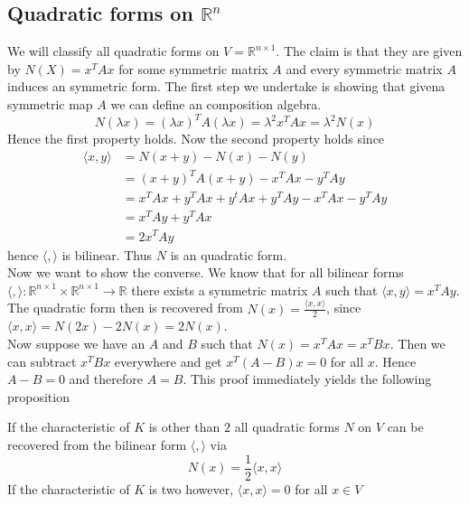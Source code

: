 \documentclass[../Thesis.tex]{subfiles}
\begin{document}
\subsection{Quadratic forms on $\mathbb{R}^n$}
We will classify all quadratic forms on $V = \mathbb{R}^{n \times 1}$. The claim is that they are given by $N(X) = x^T A x$ for some symmetric matrix $A$ and every symmetric matrix $A$ induces an symmetric form. The first step we undertake is showing that givena symmetric map $A$ we can define an composition algebra.
\begin{equation}
N(\lambda x) = (\lambda x) ^T A (\lambda x) = \lambda^2 x^T A x = \lambda^2 N(x)
\end{equation}
Hence the first property holds. Now the second property holds since
\begin{align}
\langle x, y \rangle &=  N( x + y) - N(x) - N(y) \\
                     &= (x + y)^T A(x + y) - x^TAx - y^TAy\\
                     &= x^TAx + y^TAx + y^tAx + y^TAy -x^TAx - y^TAy\\
                     &=x^TAy + y^TAx \\
                     &=2x^TAy
\end{align}
hence $\langle , \rangle$ is bilinear. Thus $N$ is an quadratic form.
\\Now we want to show the converse. We know that for all bilinear forms $ \langle , \rangle :\mathbb{R}^{n \times 1} \times \mathbb{R}^{n \times 1} \rightarrow \mathbb{R}$ there exists a symmetric matrix $A$ such that $\langle x, y\rangle = x^TAy$. The quadratic form then is recovered from $N(x) = \frac{\langle x, x\rangle}{2}$, since $\langle x, x\rangle = N(2x) - 2N(x) = 2N(x)$.
\\Now suppose we have an $A$ and $B$ such that $N(x) = x^TAx = x^TBx$. Then we can subtract $x^TBx$ everywhere and get $x^T(A-B)x = 0$ for all $x$. Hence $A-B = 0$ and therefore $A = B$.
This proof immediately yields the following proposition
\begin{prop}
If the characteristic of $K$ is other than $2$ all quadratic forms $N$ on $V$ can be recovered from the bilinear form $\langle , \rangle$ via 
\begin{equation}
N(x) = \frac{1}{2}\langle x, x \rangle
\end{equation}
If the characteristic of $K$ is two however, $\langle x, x \rangle = 0$ for all $x \in V$
\end{prop}
\end{document}
